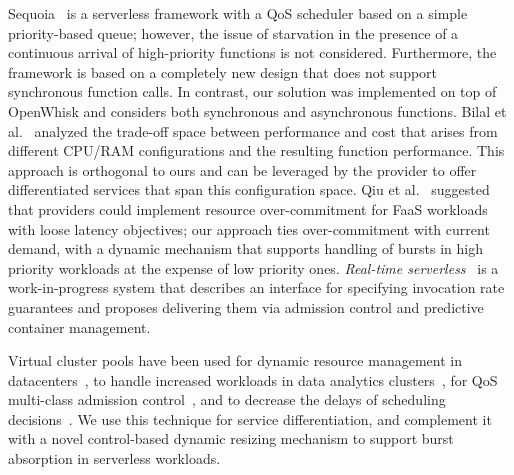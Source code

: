 Sequoia~\cite{Tariq:SOCC:2020:Sequoia} is a serverless framework with a QoS scheduler based on a simple priority-based queue; however, the issue of starvation in the presence of a continuous arrival of high-priority functions is not considered.
Furthermore, the framework is based on a completely new design that does not support synchronous function calls.
In contrast, our solution was implemented on top of OpenWhisk and considers both synchronous and asynchronous functions.
Bilal et al.~\cite{Bilal:CoRR:2021:GreatFreedom} analyzed the trade-off space between performance and cost that arises from different CPU/RAM configurations and the resulting function performance.
This approach is orthogonal to ours and can be leveraged by the provider to offer differentiated services that span this configuration space.
Qiu et al.~\cite{Qiu:WOSC:2021:LatencyCritical} suggested that providers could implement resource over-commitment for FaaS workloads with loose latency objectives;
our approach ties over-commitment with current demand, with a dynamic mechanism that supports handling of bursts in high priority workloads at the expense of low priority ones.
\emph{Real-time serverless}~\cite{Nguyen:WoSC:2019:Real-Time} is a work-in-progress system that describes an interface for specifying invocation rate guarantees and proposes delivering them via admission control and predictive container management.


Virtual cluster pools have been used for dynamic resource management in datacenters~\cite{Chase:HPDC:2003:COD}, to handle increased workloads in data analytics clusters~\cite{Lee:HotCloud:2011:Heterogeneity-Aware}, for QoS multi-class admission control~\cite{Delimitrou:ICAC:2013:ARQ}, and to decrease the delays of scheduling decisions~\cite{singhvi2021atoll}. 
We use this technique for service differentiation, and complement it with a novel control-based dynamic resizing mechanism to support burst absorption in serverless workloads.

